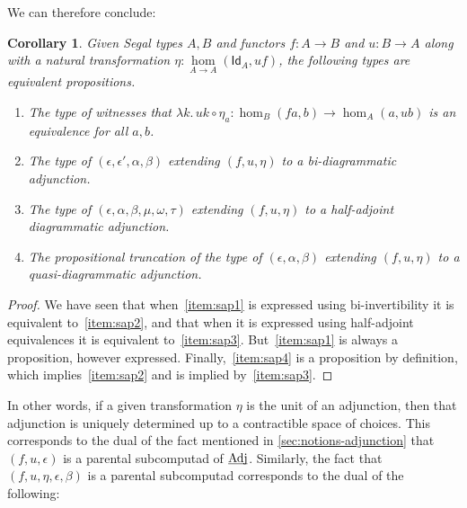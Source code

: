 \documentclass[12pt]{amsart}
\theoremstyle{plain}
\newtheorem{cor}[thm]{Corollary}
\theoremstyle{definition}
\theoremstyle{remark}
\numberwithin{equation}{section}
\def\nat#1#2{\underset{#1\to#2}{\hom}}
\newcommand{\lam}[1]{\lambda #1.\,}
\newcommand{\idfunc}[1]{\mathsf{Id}_{#1}}
\begin{document}
We can therefore conclude:

\begin{cor}\label{thm:segal-adj-prop}
  Given Segal types $A,B$ and functors $f:A\to B$ and $u:B\to A$ along with a natural transformation $\eta:\nat AA (\idfunc A,uf)$, the following types are equivalent propositions.
  \begin{enumerate}[label=(\roman*)]
  \item The type of witnesses that $\lam{k} u k \circ \eta_a : \hom_B(fa,b) \to \hom_A(a,ub) $ is an equivalence for all $a,b$.\label{item:sap1}
  \item The type of $(\epsilon,\epsilon',\alpha,\beta)$ extending $(f,u,\eta)$ to a bi-diagrammatic adjunction.\label{item:sap2}
  \item The type of $(\epsilon,\alpha,\beta,\mu,\omega,\tau)$ extending $(f,u,\eta)$ to a half-adjoint diagrammatic adjunction.\label{item:sap3}
  \item The propositional truncation of the type of $(\epsilon,\alpha,\beta)$ extending $(f,u,\eta)$ to a quasi-diagrammatic adjunction.\label{item:sap4}
  \end{enumerate}
\end{cor}
\begin{proof}
  We have seen that when~\ref{item:sap1} is expressed using bi-invertibility it is equivalent to~\ref{item:sap2}, and that when it is expressed using half-adjoint equivalences it is equivalent to~\ref{item:sap3}.
  But~\ref{item:sap1} is always a proposition, however expressed.
  Finally,~\ref{item:sap4} is a proposition by definition, which implies~\ref{item:sap2} and is implied by~\ref{item:sap3}.
\end{proof}

In other words, if a given transformation $\eta$ is the unit of an adjunction, then that adjunction is uniquely determined up to a contractible space of choices.
This corresponds to the dual of the fact mentioned in \cref{sec:notions-adjunction} that $(f,u,\epsilon)$ is a parental subcomputad of $\underline{\smash[b]{\mathrm{Adj}}}$.
Similarly, the fact that $(f,u,\eta,\epsilon,\beta)$ is a parental subcomputad corresponds to the dual of the following:
\end{document}

